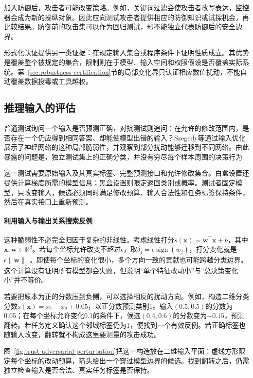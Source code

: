 加入防御后，攻击者可能改变策略。例如，关键词过滤会使攻击者改写表达，监控器会成为新的操纵对象。因此应向测试攻击者提供相应的防御知识或试探机会，再比较结果。防御前的攻击集可以作为回归测试，却不能独立代表防御后的安全边界。

形式化认证提供另一类证据：在规定输入集合或程序条件下证明性质成立。其优势是覆盖整个被规定的集合，限制则在于模型、输入空间和权限假设是否覆盖实际系统。第~\ref{sec:robustness-certification}节的局部变化界只认证相应数值扰动，不能自动覆盖数据投毒或工具越权。

\subsection{推理输入的评估}
\label{sec:security-prediction-test}

普通测试询问一个输入是否预测正确，对抗测试则追问：在允许的修改范围内，是否存在一个仍应得到相同答案、却能使模型出错的输入？Szegedy等通过输入优化展示了神经网络的这种局部脆弱性，并观察到部分扰动能够迁移到不同网络。由此暴露的问题是，独立测试集上的正确分类，并没有穷尽每个样本周围的决策行为

这一测试需要原始输入及其真实标签、完整预测接口和允许修改集合。白盒设置还提供计算梯度所需的模型信息；黑盒设置则限定返回类别或概率。测试者固定模型，只改变输入，候选必须同时满足修改预算、输入合法性和任务标签保持条件，然后在真实接口上重新预测。

\paragraph{利用输入与输出关系搜索反例}

这种脆弱性不必完全归因于复杂的非线性。考虑线性打分$s(\bm{x})=\bm{w}^{\top}\bm{x}+b$，其中$\bm{x},\bm{w}\in\mathbb R^d$。若每个坐标允许改变不超过$\epsilon$，取$\delta_j=\epsilon\operatorname{sign}(w_j)$，打分变化就是$\epsilon\|\bm{w}\|_1$。即使每个坐标的变化很小，多个方向一致的贡献也可能跨越分类边界。这个计算没有证明所有模型都会失败，但说明“单个特征改动小”与“总决策变化小”并不等价。

若要把原本为正的分数压到负侧，可以选择相反的扰动方向。例如，构造二维分类分数$s(\bm{x})=x_1-x_2+0.05$，以正分数预测类别1。输入$(0.5,0.5)$的分数为0.05；在每个坐标允许变化0.1的条件下，候选$(0.4,0.6)$的分数变为$-0.15$，预测翻转。若任务定义确认这个邻域标签仍为1，便找到一个有效反例。若正确标签也随输入改变，翻转就不构成这里要测量的攻击成功。

图~\ref{fig:trust-adversarial-perturbation}把这一构造放在二维输入平面：虚线方形限定每个坐标的改动预算，箭头给出一个穿过模型边界的候选。找到翻转之后，仍需独立检查输入是否合法、真实任务标签是否保持。

